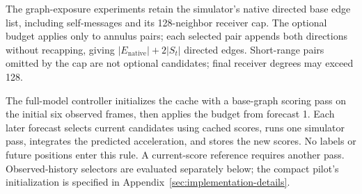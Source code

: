 The graph-exposure experiments retain the simulator's native directed base edge list, including self-messages and its 128-neighbor receiver cap. The optional budget applies only to annulus pairs; each selected pair appends both directions without recapping, giving $|E_{\mathrm{native}}|+2|S_t|$ directed edges. Short-range pairs omitted by the cap are not optional candidates; final receiver degrees may exceed 128.

The full-model controller initializes the cache with a base-graph scoring pass on the initial six observed frames, then applies the budget from forecast 1. Each later forecast selects current candidates using cached scores, runs one simulator pass, integrates the predicted acceleration, and stores the new scores. No labels or future positions enter this rule. A current-score reference requires another pass. Observed-history selectors are evaluated separately below; the compact pilot's initialization is specified in Appendix~\ref{sec:implementation-details}.

